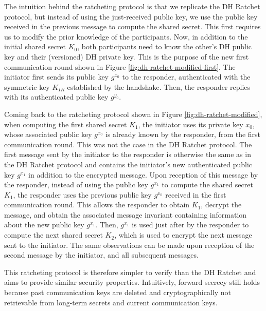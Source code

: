 The intuition behind the ratcheting protocol is that we replicate the DH Ratchet protocol, but instead of using the just-received public key, we use the public key received in the previous message to compute the shared secret.
This first requires us to modify the prior knowledge of the participants. Now, in addition to the initial shared secret $K_0$, both participants need to know the other's DH public key and their (versioned) DH private key.
This is the purpose of the new first communication round shown in Figure \ref{fig:dh-ratchet-modified-first}. 
The initiator first sends its public key $g^{x_0}$ to the responder, authenticated with the symmetric key $K_{IR}$ established by the handshake. Then, the responder replies with its authenticated public key $g^{y_0}$.

Coming back to the ratcheting protocol shown in Figure \ref{fig:dh-ratchet-modified}, when computing the first shared secret $K_1$, the initiator uses its private key $x_0$, whose associated public key $g^{x_0}$ is already known by the responder, from the first communication round.
This was not the case in the DH Ratchet protocol.
The first message sent by the initiator to the responder is otherwise the same as in the DH Ratchet protocol and contains the initiator's new authenticated public key $g^{x_1}$ in addition to the encrypted message.
Upon reception of this message by the responder, instead of using the public key $g^{x_1}$ to compute the shared secret $K_1$, the responder uses the previous public key $g^{x_0}$ received in the first communication round.
This allows the responder to obtain $K_1$, decrypt the message, and obtain the associated message invariant containing information about the new public key $g^{x_1}$.
Then, $g^{x_1}$ is used just after by the responder to compute the next shared secret $K_2$, which is used to encrypt the next message sent to the initiator.
The same observations can be made upon reception of the second message by the initiator, and all subsequent messages. 

This ratcheting protocol is therefore simpler to verify than the DH Ratchet and aims to provide similar security properties.
Intuitively, forward secrecy still holds because past communication keys are deleted and cryptographically not retrievable from long-term secrets and current communication keys.

